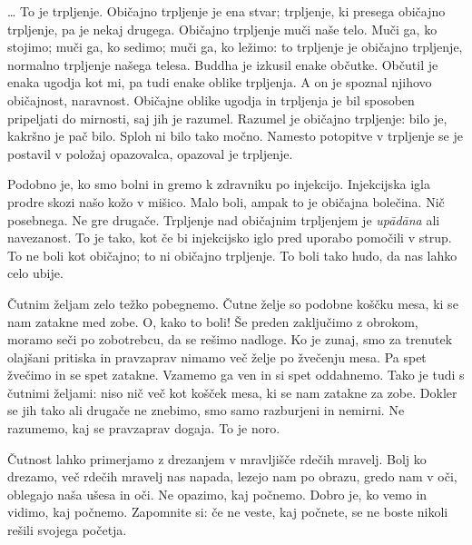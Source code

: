 \clearpage


\ldots{} To je trpljenje. Običajno trpljenje je ena stvar; trpljenje, ki presega običajno trpljenje, pa je nekaj drugega. Običajno trpljenje muči naše telo. Muči ga, ko stojimo; muči ga, ko sedimo; muči ga, ko ležimo: to trpljenje je običajno trpljenje, normalno trpljenje našega telesa. Buddha je izkusil enake občutke. Občutil je enaka ugodja kot mi, pa tudi enake oblike trpljenja. A on je spoznal njihovo običajnost, naravnost. Običajne oblike ugodja in trpljenja je bil sposoben pripeljati do mirnosti, saj jih je razumel. Razumel je običajno trpljenje: bilo je, kakršno je pač bilo. Sploh ni bilo tako močno. Namesto potopitve v trpljenje se je postavil v položaj opazovalca, opazoval je trpljenje.

Podobno je, ko smo bolni in gremo k zdravniku po injekcijo. Injekcijska igla prodre skozi našo kožo v mišico. Malo boli, ampak to je običajna bolečina. Nič posebnega. Ne gre drugače. Trpljenje nad običajnim trpljenjem je \emph{upādāna} ali navezanost. To je tako, kot če bi injekcijsko iglo pred uporabo pomočili v strup. To ne boli kot običajno; to ni običajno trpljenje. To boli tako hudo, da nas lahko celo ubije.

\clearpage


Čutnim željam zelo težko pobegnemo. Čutne želje so podobne koščku mesa, ki se nam zatakne med zobe. O, kako to boli! Še preden zaključimo z obrokom, moramo seči po zobotrebcu, da se rešimo nadloge. Ko je zunaj, smo za trenutek olajšani pritiska in pravzaprav nimamo več želje po žvečenju mesa. Pa spet žvečimo in se spet zatakne. Vzamemo ga ven in si spet oddahnemo. Tako je tudi s čutnimi željami: niso nič več kot košček mesa, ki se nam zatakne za zobe. Dokler se jih tako ali drugače ne znebimo, smo samo razburjeni in nemirni. Ne razumemo, kaj se pravzaprav dogaja. To je noro.


Čutnost lahko primerjamo z drezanjem v mravljišče rdečih mravelj. Bolj ko drezamo, več rdečih mravelj nas napada, lezejo nam po obrazu, gredo nam v oči, oblegajo naša ušesa in oči. Ne opazimo, kaj počnemo. Dobro je, ko vemo in vidimo, kaj počnemo. Zapomnite si: če ne veste, kaj počnete, se ne boste nikoli rešili svojega početja.

\clearpage


